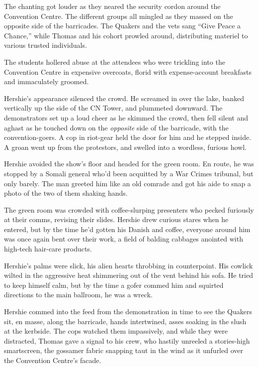 The chanting got louder as they neared the security cordon around
the Convention Centre. The different groups all mingled as they
massed on the opposite side of the barricades. The Quakers and the
vets sang ``Give Peace a Chance,'' while Thomas and his cohort
prowled around, distributing materiel to various trusted
individuals.

The students hollered abuse at the attendees who were trickling
into the Convention Centre in expensive overcoats, florid with
expense-account breakfasts and immaculately groomed.

Hershie's appearance silenced the crowd. He screamed in over the
lake, banked vertically up the side of the CN Tower, and plummeted
downward. The demonstrators set up a loud cheer as he skimmed the
crowd, then fell silent and aghast as he touched down on the
\emph{opposite} side of the barricade, with the convention-goers. A
cop in riot-gear held the door for him and he stepped inside. A
groan went up from the protestors, and swelled into a wordless,
furious howl.

\tb

Hershie avoided the show's floor and headed for the green room. En
route, he was stopped by a Somali general who'd been acquitted by a
War Crimes tribunal, but only barely. The man greeted him like an
old comrade and got his aide to snap a photo of the two of them
shaking hands.

The green room was crowded with coffee-slurping presenters who
pecked furiously at their comms, revising their slides. Hershie
drew curious stares when he entered, but by the time he'd gotten
his Danish and coffee, everyone around him was once again bent over
their work, a field of balding cabbages anointed with high-tech
hair-care products.

Hershie's palms were slick, his alien hearts throbbing in
counterpoint. His cowlick wilted in the aggressive heat shimmering
out of the vent behind his sofa. He tried to keep himself calm, but
by the time a gofer commed him and squirted directions to the main
ballroom, he was a wreck.

\tb

Hershie commed into the feed from the demonstration in time to see
the Quakers sit, en masse, along the barricade, hands intertwined,
asses soaking in the slush at the kerbside. The cops watched them
impassively, and while they were distracted, Thomas gave a signal
to his crew, who hastily unreeled a stories-high smartscreen, the
gossamer fabric snapping taut in the wind as it unfurled over the
Convention Centre's facade.


